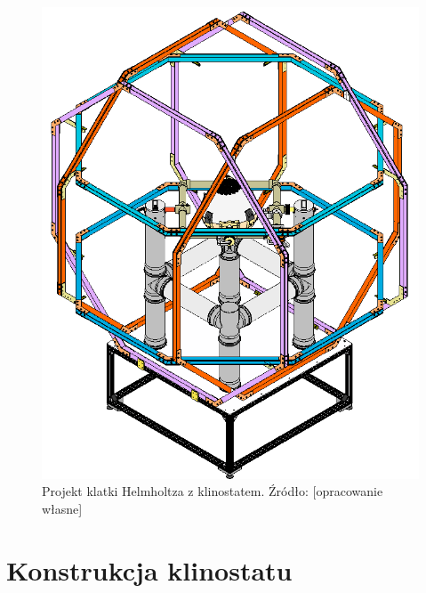 \begin{figure}
	\centering
	\includegraphics[scale=0.3]{klinostat_klatka}
	\caption{Projekt klatki Helmholtza z klinostatem. Źródło: [opracowanie własne]} 
	\label{fig:klatka_helmholtza}
\end{figure}

\section{Konstrukcja klinostatu} \label{konstrukcja}

